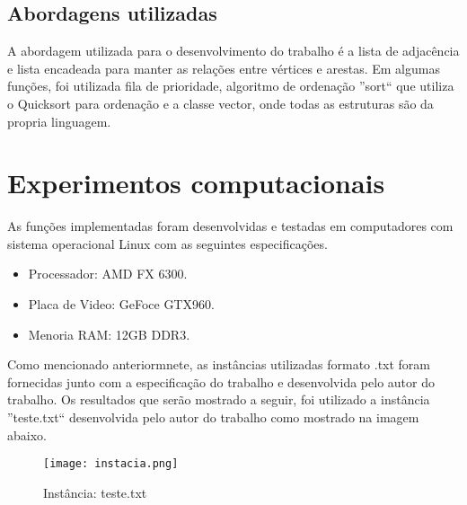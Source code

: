 \documentclass[12pt, fleqn]{article}
\begin{document}
      \subsection{Abordagens utilizadas}
	\par A abordagem utilizada para o desenvolvimento do trabalho é a lista de adjacência e lista encadeada para manter as relações entre vértices e arestas. 
	Em algumas funções, foi utilizada fila de prioridade, algoritmo de ordenação  ''sort`` que utiliza o Quicksort para ordenação e a classe vector, onde todas as estruturas são da propria linguagem. 

    \section{Experimentos computacionais}
      \par As funções implementadas foram desenvolvidas e testadas em computadores com sistema operacional Linux com as seguintes especificações.
      \begin{itemize}
	  \item Processador: AMD FX 6300.
	  \item Placa de Video: GeFoce GTX960.
	  \item Menoria RAM: 12GB DDR3.
      \end{itemize}
      \par Como mencionado anteriormnete, as instâncias utilizadas formato .txt foram fornecidas junto com a especificação do trabalho e desenvolvida pelo autor do trabalho. 
	Os resultados que serão mostrado a seguir, foi utilizado a instância ''teste.txt`` desenvolvida pelo autor do trabalho como mostrado na imagem abaixo.	
      
      \begin{figure}[!htpb]
	  \centering
	  \texttt{[image: instacia.png]}
	  \caption{Instância: teste.txt}
	  \label{fig:Instância: teste.txt}
      \end{figure}     
      
       
    \newpage
      
\end{document}

